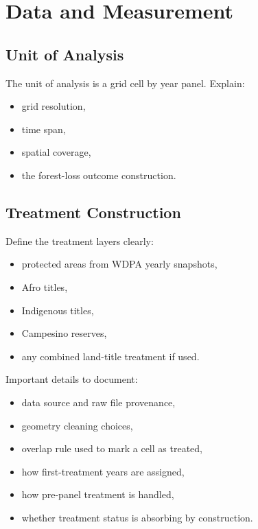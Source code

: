 \section{Data and Measurement}

\subsection{Unit of Analysis}

The unit of analysis is a grid cell by year panel. Explain:

\begin{itemize}
    \item grid resolution,
    \item time span,
    \item spatial coverage,
    \item the forest-loss outcome construction.
\end{itemize}

\subsection{Treatment Construction}

Define the treatment layers clearly:

\begin{itemize}
    \item protected areas from WDPA yearly snapshots,
    \item Afro titles,
    \item Indigenous titles,
    \item Campesino reserves,
    \item any combined land-title treatment if used.
\end{itemize}

Important details to document:

\begin{itemize}
    \item data source and raw file provenance,
    \item geometry cleaning choices,
    \item overlap rule used to mark a cell as treated,
    \item how first-treatment years are assigned,
    \item how pre-panel treatment is handled,
    \item whether treatment status is absorbing by construction.
\end{itemize}

